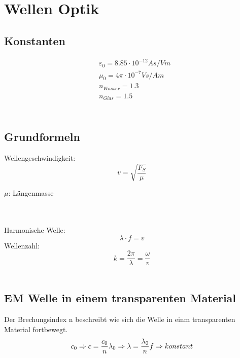 



\chapter{Wellen Optik}
\section{Konstanten}
\[
\boxed{\begin{aligned}	
		&\varepsilon_0 = 8.85\cdot 10^{-12} As/Vm\\
		&\mu_0 = 4\pi \cdot 10^{-7} Vs/Am\\
		&n_{Wasser} = 1.3 \\
		&n_{Glas} = 1.5 \\
	\end{aligned}}	\]
\\
\section{Grundformeln}
Wellengeschwindigkeit:
\[
	v=\sqrt{\frac{F_S}{\mu}}
\]
\begin{footnotesize}
	$\mu$: Längenmasse
\end{footnotesize}
\\
\\
Harmonische Welle:
\[
	\lambda \cdot f = v
\]
Wellenzahl:
\[
	k=\frac{2\pi}{\lambda}=\frac{\omega}{v}
\]
\\
\section{EM Welle in einem transparenten Material}
Der Brechungsindex n beschreibt wie sich die Welle in einm transparenten Material fortbewegt.
\[
	c_0 \Rightarrow c=  \frac{c_0}{n} \\
	\lambda_0 \Rightarrow \lambda=  \frac{\lambda_0}{n} \\
	f \Rightarrow  konstant\\
\]
\\
